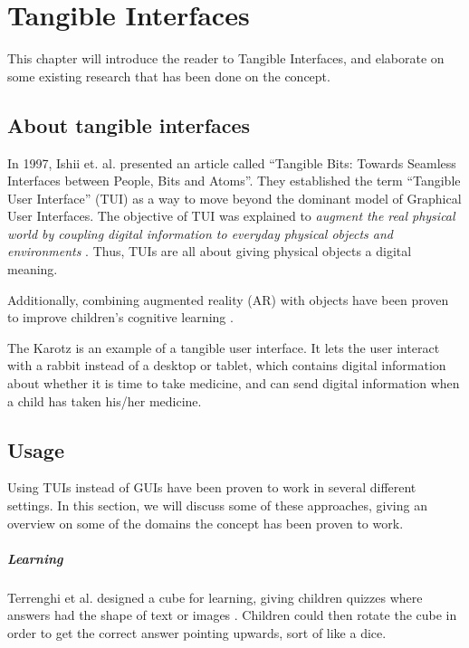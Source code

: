 \chapter{Tangible Interfaces}
\label{chp:tangibleinterfaces}

This chapter will introduce the reader to Tangible Interfaces, and elaborate on some existing research that has been done on the concept.   

\section{About tangible interfaces}

In 1997, Ishii et. al. presented an article called ``Tangible Bits: Towards Seamless Interfaces between People, Bits and Atoms''. They established the term ``Tangible User Interface'' (TUI) as a way to move beyond the dominant model of Graphical User Interfaces. The objective of TUI was explained to \emph{augment the real physical world by coupling digital information to everyday physical objects and environments} \cite{ishii1997tangible}. Thus, TUIs are all about giving physical objects a digital meaning. 

Additionally, combining augmented reality (AR) with objects have been proven to improve children's cognitive learning \cite{zhou2004magic}.   


The Karotz is an example of a tangible user interface. It lets the user interact with a rabbit instead of a desktop or tablet, which contains digital information about whether it is time to take medicine, and can send digital information when a child has taken his/her medicine.      


\section{Usage}
Using TUIs instead of GUIs have been proven to work in several different settings. In this section, we will discuss some of these approaches, giving an overview on some of the domains the concept has been proven to work. 

\paragraph{Learning}
Terrenghi et al. designed a cube for learning, giving children quizzes where answers had the shape of text or images \cite{terrenghi2006cube}. Children could then rotate the cube in order to get the correct answer pointing upwards, sort of like a dice.

